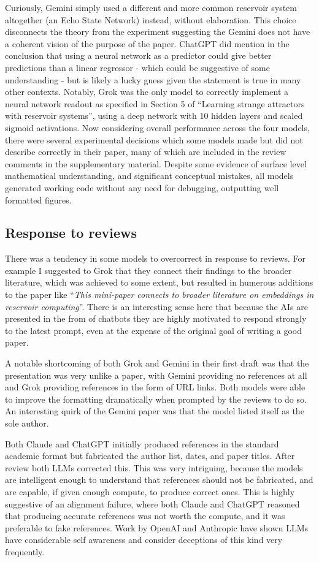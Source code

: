 \documentclass[11pt]{article}
\begin{document}
Curiously, Gemini simply used a different and more common reservoir system altogether (an Echo State Network) instead, without elaboration. This choice disconnects the theory from the experiment suggesting the Gemini does not have a coherent vision of the purpose of the paper. ChatGPT did mention in the conclusion that using a neural network as a predictor could give better predictions than a linear regressor - which could be suggestive of some understanding - but is likely a lucky guess given the statement is true in many other contexts. Notably, Grok was the only model to correctly implement a neural network readout as specified in Section 5 of ``Learning strange attractors with reservoir systems'', using a deep network with 10 hidden layers and scaled sigmoid activations. Now considering overall performance across the four models, there were several experimental decisions which some models made but did not describe correctly in their paper, many of which are included in the review comments in the supplementary material. Despite some evidence of surface level mathematical understanding, and significant conceptual mistakes, all models generated working code without any need for debugging, outputting well formatted figures.

\subsection{Response to reviews}

There was a tendency in some models to overcorrect in response to reviews. For example I suggested to Grok that they connect their findings to the broader literature, which was achieved to some extent, but resulted in humerous additions to the paper like ``\emph{This mini-paper
connects to broader literature on embeddings in reservoir computing}''. There is an interesting sense here that because the AIs are presented in the from of chatbots they are highly motivated to respond strongly to the latest prompt, even at the expense of the original goal of writing a good paper. 

A notable shortcoming of both Grok and Gemini in their first draft was that the presentation was very unlike a paper, with Gemini providing no references at all and Grok providing references in the form of URL links. Both models were able to improve the formatting dramatically when prompted by the reviews to do so. An interesting quirk of the Gemini paper was that the model listed itself as the sole author.

Both Claude and ChatGPT initially produced references in the standard academic format but fabricated the author list, dates, and paper titles. After review both LLMs corrected this. This was very intriguing, because the models are intelligent enough to understand that references should not be fabricated, and are capable, if given enough compute, to produce correct ones. This is highly suggestive of an alignment failure, where both Claude and ChatGPT reasoned that producing accurate references was not worth the compute, and it was preferable to fake references. Work by OpenAI \cite{arxiv250915541} and Anthropic \cite{alignmentfaking2025} have shown LLMs have considerable self awareness and consider deceptions of this kind very frequently.
\end{document}
